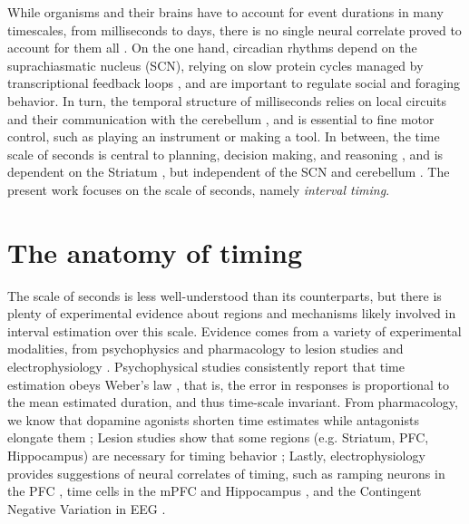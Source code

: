     While organisms and their brains have to account for event durations in many timescales, from milliseconds to days, there is no single neural correlate proved to account for them all \cite{buhusi2005makes, buhusi2016clocks, hardy2016neurocomputational, lewis2003distinct, mauk2004neural}. On the one hand, circadian rhythms depend on the suprachiasmatic nucleus (SCN), relying on slow protein cycles managed by transcriptional feedback loops \cite{buhusi2005makes}, and are important to regulate social and foraging behavior. In turn, the temporal structure of milliseconds relies on local circuits and their communication with the cerebellum \cite{ohmae2017cerebellar}, and is essential to fine motor control, such as playing an instrument or making a tool. In between, the time scale of seconds is central to planning, decision making, and reasoning \cite{buhusi2005makes}, and is dependent on the Striatum \cite{mello2015scalable}, but independent of the SCN \cite{lewis2003interval} and cerebellum \cite{harrington2004does}. The present work focuses on the scale of seconds, namely \textit{interval timing}.
    
\section{The anatomy of timing}
\label{sub:anatomy}
    The scale of seconds is less well-understood than its counterparts, but there is plenty of experimental evidence about regions and mechanisms likely involved in interval estimation over this scale. Evidence comes from a variety of experimental modalities, from psychophysics \cite{ohmae2017cerebellar} and pharmacology \cite{pine2010dopamine, meck2012gene, drew2003effects, cheng2016clock, ludvig2008stimulus} to lesion studies \cite{meck2006frontal} and electrophysiology \cite{bakhurin2017differential}. Psychophysical studies consistently report that time estimation obeys Weber's law \cite{gibbon1977scalar}, that is, the error in responses is proportional to the mean estimated duration, and thus time-scale invariant. From pharmacology, we know that dopamine agonists shorten time estimates \cite{cheng2016clock, pine2010dopamine} while antagonists elongate them \cite{drew2003effects}; Lesion studies show that some regions (e.g. Striatum, PFC, Hippocampus) are necessary for timing behavior \cite{cho2010differential};
    Lastly, electrophysiology provides suggestions of neural correlates of timing, such as ramping neurons in the PFC \cite{kim2013neural}, time cells in the mPFC \cite{tiganj2016sequential} and Hippocampus \cite{eichenbaum2014time}, and the Contingent Negative Variation in EEG \cite{pfeuty2005relationship}.
     
